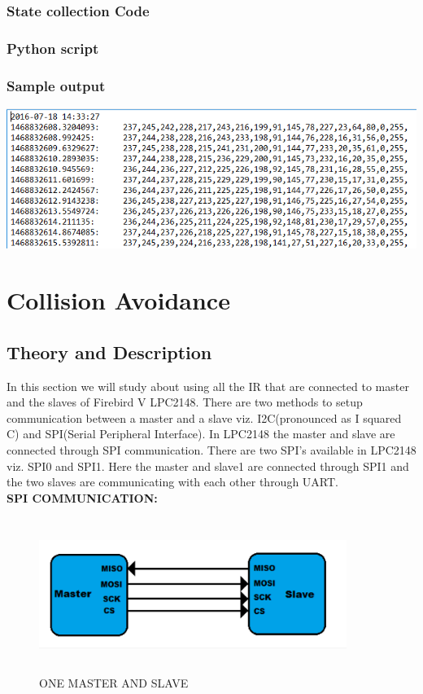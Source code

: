 \documentclass[11pt,a4paper]{book}
\begin{document}
	\subsubsection{State collection Code}
	
	\newpage 
	\subsubsection{Python script}
	
	
	\subsubsection{Sample output}
	\includegraphics[width=14cm]{serialcomm}
	
	\section{Collision Avoidance}
	\subsection{Theory and Description}
	In this section we will study about using all the IR that are connected to master and the slaves of Firebird V LPC2148. There are two methods to setup communication between a master and a slave viz. I2C(pronounced as I squared C) and SPI(Serial Peripheral Interface). In LPC2148 the master and slave are connected through SPI communication. There are two SPI's available in LPC2148 viz. SPI0 and SPI1. Here the master and slave1 are connected through SPI1 and the two slaves are communicating with each other through UART.\\
	\newpage
	\textbf{SPI COMMUNICATION:}\\
	\begin{figure}[h]
		\centering
		\includegraphics[width=10cm,height=5cm]{SPI.PNG}
		\caption{ONE MASTER AND SLAVE}
	\end{figure}
	
\end{document}
